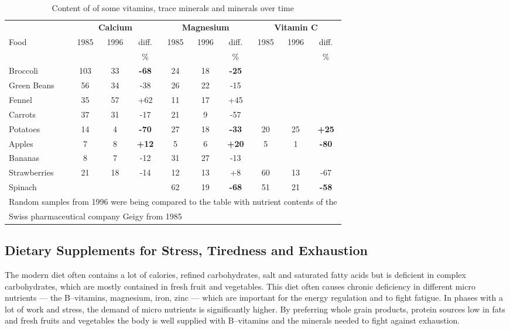 \documentclass[../main.tex]{subfiles}
\begin{document}
  \begin{table}[htb!]
    \centering
    \begin{tabular}{l|ccc|ccc|ccc}
      &\multicolumn{3}{c}{\textbf{Calcium}} & \multicolumn{3}{c}{\textbf{Magnesium}} & \multicolumn{3}{c}{\textbf{Vitamin C}} \\
      Food & 1985 & 1996 & diff. & 1985 & 1996 & diff. & 1985 & 1996 & diff. \\
      & & & \%  & & & \%  & & & \% \\
      \hline
      Broccoli & 103 & 33 & \textbf{-68} & 24 & 18 & \textbf{-25} \\
      Green Beans & 56 & 34 & -38 & 26 & 22 & -15 \\
      Fennel & 35 & 57 & +62 & 11 & 17 & +45 \\
      Carrots & 37 & 31 & -17 & 21 & 9 & -57 \\
      Potatoes & 14 & 4 & \textbf{-70} & 27 & 18 & \textbf{-33} & 20 & 25 & \textbf{+25} \\
      Apples & 7 & 8 & \textbf{+12} & 5 & 6 & \textbf{+20} & 5 & 1 & \textbf{-80} \\
      Bananas & 8 & 7 & -12 & 31 & 27 & -13 \\
      Strawberries & 21 & 18 & -14 & 12 & 13 & +8 & 60 & 13 & -67 \\
      Spinach & & & & 62 & 19 & \textbf{-68} & 51 & 21 & \textbf{-58}\\
      \hline
      \multicolumn{10}{l}{\footnotesize{Random samples from 1996 were being compared to the table with nutrient contents of the}}\\
      \multicolumn{10}{l}{\footnotesize{Swiss pharmaceutical company Geigy from 1985}}
    \end{tabular}
    \caption[Mineral content of food now and earlier]{Content of of some vitamins, trace minerals and minerals over time}
  \end{table}

  \subsection{Dietary Supplements for Stress, Tiredness and Exhaustion}

  The modern diet often contains a lot of calories, refined carbohydrates, salt and saturated fatty acids but
  is deficient in complex carbohydrates, which are mostly contained in fresh fruit and vegetables.
  This diet often causes chronic deficiency in different micro nutrients
  --- the B--vitamins, magnesium, iron, zinc ---
  which are important for the energy regulation and to fight fatigue.
  In phases with a lot of work and stress, the demand of micro nutrients is significantly higher.
  By preferring whole grain products, protein sources low in fats and fresh fruits and vegetables the body is well supplied
  with B--vitamins and the minerals needed to fight against exhaustion.
\end{document}
